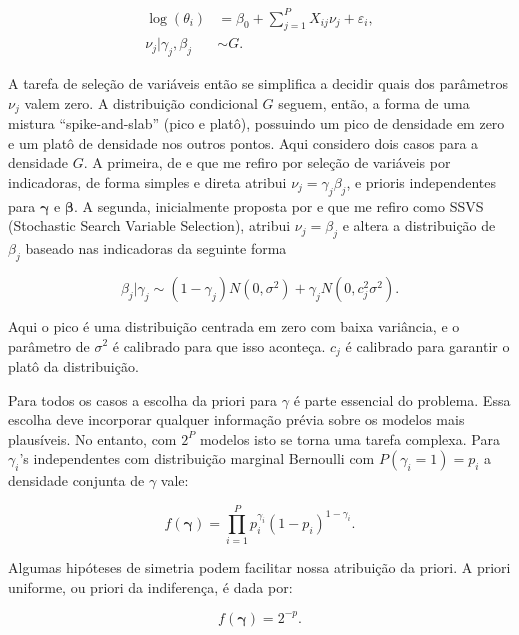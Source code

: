 \begin{equation}
\begin{split}
        \log(\theta_i) &= \beta_0 + \sum_{j=1}^{P} X_{ij} \nu_j + \varepsilon_i,\\
        \nu_j|\gamma_j, \beta_j &\sim G.
\end{split}
\end{equation}

A tarefa de seleção de variáveis então se simplifica a decidir quais dos parâmetros $\nu_j$ valem zero. A distribuição condicional $G$ seguem, então, a forma de uma mistura ``spike-and-slab'' (pico e platô), possuindo um pico de densidade em zero e um platô de densidade nos outros pontos. Aqui considero dois casos para a densidade $G$. A primeira, de \cite{KM1998} e que me refiro por seleção de variáveis por indicadoras, de forma simples e direta atribui $\nu_j = \gamma_j \beta_j$, e prioris independentes para $\boldsymbol{\gamma}$ e $\boldsymbol{\beta}$. A segunda, inicialmente proposta por \cite{McCulloch1993} e que me refiro como SSVS (Stochastic Search Variable Selection), atribui $\nu_j = \beta_j$ e altera a distribuição de $\beta_j$ baseado nas indicadoras da seguinte forma

\begin{equation}
    \beta_j|\gamma_j \sim (1- \gamma_j) N(0,\sigma^2) + \gamma_j N(0, c_j^2\sigma^2).
\end{equation}


Aqui o pico é uma distribuição centrada em zero com baixa variância, e o parâmetro de $\sigma^2$ é calibrado para que isso aconteça. $c_j$ é calibrado para garantir o platô da distribuição. 

Para todos os casos a escolha da priori para $\gamma$ é parte essencial do problema. Essa escolha deve incorporar qualquer informação prévia sobre os modelos mais plausíveis. No entanto, com $2^P$ modelos isto se torna uma tarefa complexa. Para $\gamma_i$'s independentes com distribuição marginal Bernoulli com $P(\gamma_i = 1) = p_i$ a densidade conjunta de $\gamma$ vale:

\begin{equation}\label{eq:joint_density_gamma}
f(\boldsymbol{\gamma}) = \prod_{i = 1}^{P} p_i^{\gamma_i}(1-p_i)^{1-\gamma_i}.
\end{equation}

Algumas hipóteses de simetria podem facilitar nossa atribuição da priori. A priori uniforme, ou priori da indiferença, é dada por:

\begin{equation}
    f(\boldsymbol{\gamma}) = 2^{-p}.
\end{equation}

